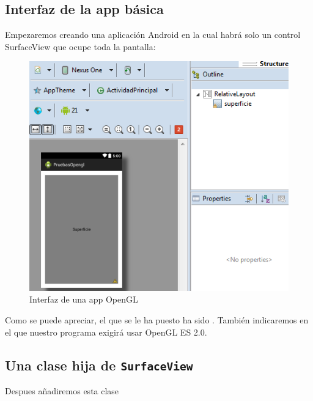 \documentclass[a4paper,12pt,spanish]{sphinxmanual}
\begin{document}
\subsection{Interfaz de la app básica}
\label{cap1opengl:interfaz-de-la-app-basica}
Empezaremos creando una aplicación Android en la cual habrá solo un control SurfaceView que ocupe toda la pantalla:
\begin{figure}[htbp]
\centering
\capstart

\includegraphics{ejemploopengl1.png}
\caption{Interfaz de una app OpenGL}\end{figure}

Como se puede apreciar, el  que se le ha puesto ha sido . También indicaremos en el  que nuestro programa exigirá usar OpenGL ES 2.0.


\subsection{Una clase hija de \texttt{SurfaceView}}
\label{cap1opengl:una-clase-hija-de-surfaceview}
Despues añadiremos esta clase
\end{document}
